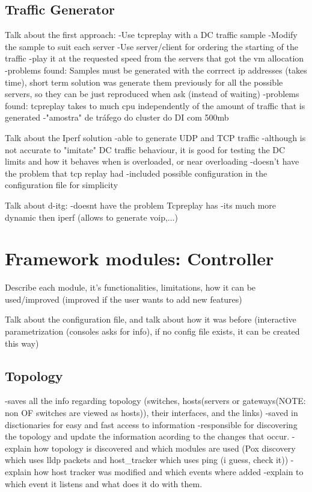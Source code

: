 \documentclass[12pt,english,oneside]{book}
\begin{document}
\subsection{Traffic Generator}
\hspace{0.6cm}

Talk about the first approach:
-Use tcpreplay with a DC traffic sample
-Modify the sample to suit each server
-Use server/client for ordering the starting of the traffic
-play it at the requested speed from the servers that got the vm allocation
-problems found: Samples must be generated with the corrrect ip addresses (takes time), short term solution was generate them previously for all the possible servers, so they can be just reproduced when ask (instead of waiting)
-problems found: tcpreplay takes to much cpu independently of the amount of traffic that is generated
-"amostra" de tráfego do cluster do DI com 500mb


Talk about the Iperf solution
-able to generate UDP and TCP traffic
-although is not accurate to "imitate" DC traffic behaviour, it is good for testing the DC limits and how it behaves when is overloaded, or near overloading
-doesn't have the problem that tcp replay had
-included possible configuration in the configuration file for simplicity

Talk about d-itg:
-doesnt have the problem Tcpreplay has
-its much more dynamic then iperf (allows to generate voip,...)

\newpage

\section{Framework modules: Controller}
\hspace{0.6cm}

Describe each module, it's functionalities, limitations, how it can be used/improved (improved if the user wants to add new features)

Talk about the configuration file, and talk about how it was before (interactive parametrization (consoles asks for info), if no config file exists, it can be created this way)

\subsection{Topology}
\hspace{0.6cm}

-saves all the info regarding topology (switches, hosts(servers or gateways(NOTE: non OF switches are viewed as hosts)), their interfaces, and the links)
-saved in disctionaries for easy and fast access to information
-responsible for discovering the topology and update the information acording to the changes that occur.
-explain how topology is discovered and which modules are used (Pox discovery which uses lldp packets and host\_tracker which uses ping (i guess, check it))
-explain how host tracker was modified and which events where added
-explain to which event it listens and what does it do with them.
\end{document}
